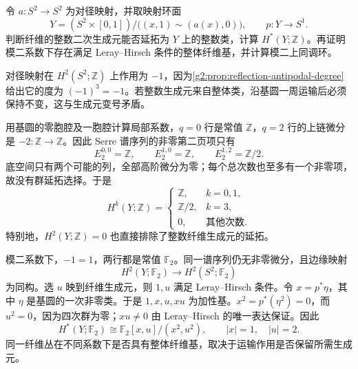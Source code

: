 \begin{exercise}\label{g2:ex:leray-hirsch-orientation-torus}
	令 \(a:S^2\to S^2\) 为对径映射，并取映射环面
	\[
		Y=(S^2\times[0,1])/\bigl((x,1)\sim(a(x),0)\bigr),\qquad p:Y\to S^1.
	\]
	判断纤维的整数二次生成元能否延拓为 \(Y\) 上的整数类，计算 \(H^*(Y;\mathbb Z)\)。再证明模二系数下存在满足 Leray--Hirsch 条件的整体纤维基，并计算模二上同调环。
\end{exercise}
\begin{solution}
	对径映射在 \(H^2(S^2;\mathbb Z)\) 上作用为 \(-1\)，因为\cref{g2:prop:reflection-antipodal-degree}给出它的度为 \((-1)^3=-1\)。若整数生成元来自整体类，沿基圆一周运输后必须保持不变，这与生成元变号矛盾。

	用基圆的零胞腔及一胞腔计算局部系数，\(q=0\) 行是常值 \(\mathbb Z\)，\(q=2\) 行的上链微分是 \(-2:\mathbb Z\to\mathbb Z\)。因此 Serre 谱序列的非零第二页项只有
	\[
		E_2^{0,0}=\mathbb Z,\qquad E_2^{1,0}=\mathbb Z,\qquad E_2^{1,2}=\mathbb Z/2.
	\]
	底空间只有两个可能的列，全部高阶微分为零；每个总次数也至多有一个非零项，故没有群延拓选择。于是
	\[
		H^k(Y;\mathbb Z)=
		\begin{cases}
			\mathbb Z,&k=0,1,\\
			\mathbb Z/2,&k=3,\\
			0,&\text{其他次数}.
		\end{cases}
	\]
	特别地，\(H^2(Y;\mathbb Z)=0\) 也直接排除了整数纤维生成元的延拓。

	模二系数下，\(-1=1\)，两行都是常值 \(\mathbb F_2\)。同一谱序列仍无非零微分，且边缘映射
	\[
		H^2(Y;\mathbb F_2)\longrightarrow H^2(S^2;\mathbb F_2)
	\]
	为同构。选 \(u\) 映到纤维生成元，则 \(1,u\) 满足 Leray--Hirsch 条件。令 \(x=p^*\eta\)，其中 \(\eta\) 是基圆的一次非零类。于是 \(1,x,u,xu\) 为加性基。\(x^2=p^*(\eta^2)=0\)，而 \(u^2=0\)，因为四次群为零；\(xu\ne0\) 由 Leray--Hirsch 的唯一表达保证。因此
	\[
		H^*(Y;\mathbb F_2)\cong\mathbb F_2[x,u]/(x^2,u^2),\qquad |x|=1,\quad |u|=2.
	\]
	同一纤维丛在不同系数下是否具有整体纤维基，取决于运输作用是否保留所需生成元。
\end{solution}

